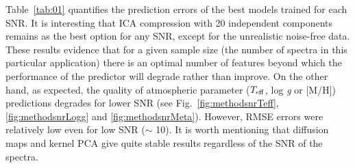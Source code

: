 \documentclass[a4paper,fleqn,usenatbib]{mnras}
\begin{document}
Table~\ref{tab:01} quantifies the prediction errors of the best models
trained for each SNR. It is interesting that ICA compression with 20
independent components remains as the best option for any SNR, except
for the unrealistic noise-free data. These results evidence that
for a given sample size (the number of spectra in this particular 
application)
there is an optimal number of features beyond which the
performance of the predictor will degrade rather than improve. 
On the other hand, as expected, the quality of atmospheric parameter 
($T_{\rm eff}$, log \textit{g} or [M/H]) predictions 
  degrades for lower SNR (see Fig.~\ref{fig:methodsnrTeff}, 
  \ref{fig:methodsnrLogg} and \ref{fig:methodsnrMeta}). However,
RMSE errors were relatively low even for low SNR ($\sim$ 10).
It is worth mentioning that diffusion maps and kernel PCA give 
quite stable results regardless of the SNR of the spectra.


\begin{table}
\centering
\caption{RMSE on the evaluation set of 2986 spectra for the best SVM trained models.}
\label{tab:01}
\end{table}

\end{document}
